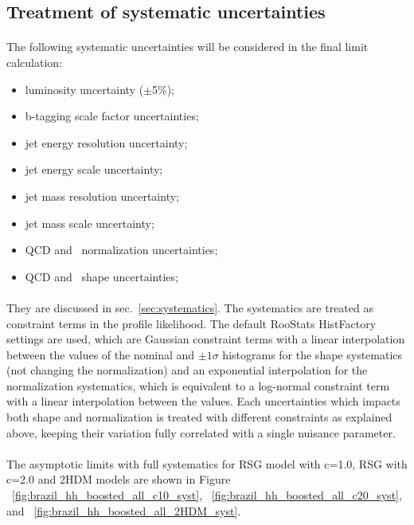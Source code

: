 \subsection{Treatment of systematic uncertainties}
\label{sec:limit_sys}


\paragraph{}
The following systematic uncertainties will be considered in the final limit calculation:
\begin{itemize}
  \item luminosity uncertainty ($\pm$5\%);
  \item b-tagging scale factor uncertainties;
  \item \largeR jet energy resolution uncertainty;
  \item \largeR jet energy scale uncertainty; 
  \item \largeR jet mass resolution uncertainty;
  \item \largeR jet mass scale uncertainty;
  \item QCD and \ttbar\ normalization uncertainties;
  \item QCD and \ttbar\ shape uncertainties;
\end{itemize}

\paragraph{}
They are discussed in sec.~\ref{sec:systematics}. The systematics are treated as constraint terms in the profile likelihood. The default RooStats HistFactory settings are used, which are Gaussian constraint terms with a linear interpolation between the values of the nominal and $\pm 1 \sigma$ histograms for the shape systematics (not changing the normalization) and an exponential interpolation for the  normalization systematics,  which is equivalent to a log-normal constraint term with a linear interpolation between the values. Each uncertainties which impacts both shape and normalization is treated with different constraints as explained above, keeping their variation fully correlated with a single nuisance parameter.


\paragraph{}
The asymptotic limits with full systematics for RSG model with c=1.0, RSG with c=2.0 and 2HDM models are shown in Figure ~\ref{fig:brazil_hh_boosted_all_c10_syst}, ~\ref{fig:brazil_hh_boosted_all_c20_syst}, and ~\ref{fig:brazil_hh_boosted_all_2HDM_syst}.

